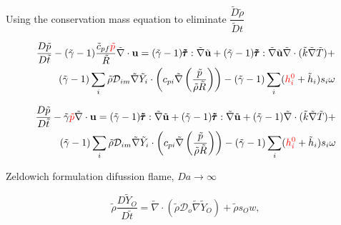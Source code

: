 \documentclass[preprint,12pt,authoryear]{elsarticle}
\begin{document}
Using the conservation mass equation 
to eliminate $\dfrac{\tilde{D}\tilde{\rho}}{\tilde{D}t}$

\begin{equation}
\begin{split}
        \frac{D \tilde{p}}{D\tilde{t}}
	-
	(\tilde{\gamma}-1)
	\frac{\tilde{c}_{pf} {\color{red} \tilde{p} }  }{\tilde{R}}
	\tilde{\nabla}\cdot{\mathbf{u}}
        =
	(\tilde{\gamma}-1)
        \pmb{\tilde{\tau}}:\tilde{\nabla} \tilde{\mathbf{u}} 
        + 
	(\tilde{\gamma}-1)
        \pmb{\tilde{\tau}}:\tilde{\nabla} \tilde{\mathbf{u}} 
        \tilde{\nabla} \cdot (\tilde{k}\tilde{\nabla} \tilde{T})
        +
	\\
	(\tilde{\gamma}-1)
        \sum\limits_i 
        \tilde{\rho}
        \mathcal{D}_{im}
        \tilde{\nabla}
        \tilde{Y}_i     
        \cdot
        \left(
                c_{pi}
                \tilde{\nabla}
                \left(
                	\frac{\tilde{p}}{\tilde{\rho}\tilde{R}}
                \right)
        \right)
	-
	(\tilde{\gamma}-1)
        \sum\limits_i
        ({\color{red} h_i^0} + \tilde{h}_i)
        s_i	
        \omega
\end{split}
\end{equation}

\begin{equation}
\begin{split}
        \frac{D \tilde{p}}{D\tilde{t}}
	-
	\tilde{\gamma}
	{\color{red} \tilde{p} }
	\tilde{\nabla}\cdot{\mathbf{u}}
        =
	(\tilde{\gamma}-1)
        \pmb{\tilde{\tau}}:\tilde{\nabla} \tilde{\mathbf{u}} 
        + 
	(\tilde{\gamma}-1)
        \pmb{\tilde{\tau}}:\tilde{\nabla} \tilde{\mathbf{u}} 
        + 
	(\tilde{\gamma}-1)
        \tilde{\nabla} \cdot (\tilde{k}\tilde{\nabla} \tilde{T})
        +
	\\
	(\tilde{\gamma}-1)
        \sum\limits_i 
        \tilde{\rho}
        \mathcal{D}_{im}
        \tilde{\nabla}
        \tilde{Y}_i     
        \cdot
        \left(
                c_{pi}
                \tilde{\nabla}
                \left(
                	\frac{\tilde{p}}{\tilde{\rho}\tilde{R}}
                \right)
        \right)
	-
	(\tilde{\gamma}-1)
        \sum\limits_i
        ({\color{red} h_i^0} + \tilde{h}_i)
        s_i	
        \omega
\end{split}
\end{equation}


Zeldowich formulation difussion flame, $Da\to \infty$

\begin{equation}
	\tilde{\rho} \frac{D  \tilde{Y}_O }{D \tilde{t}}
= 
	\tilde{\nabla}\cdot( \tilde{\rho} \mathcal{D}_o\tilde{\nabla} 
	\tilde{Y}_O
	)
	+
    \tilde{\rho}s_O w,
\label{eqYO}
\end{equation}
\end{document}
